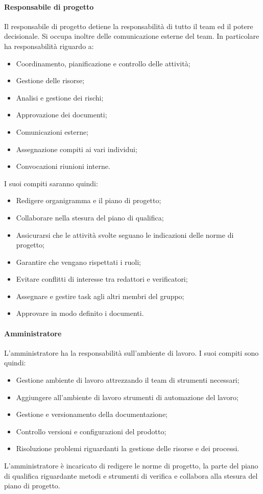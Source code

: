 \paragraph{Responsabile di progetto}
Il responsabile di progetto detiene la responsabilità di tutto il team ed il potere decisionale. Si occupa inoltre delle comunicazione esterne del team.
In particolare ha responsabilità riguardo a:
\begin{itemize}
	\item Coordinamento, pianificazione e controllo delle attività;
	\item Gestione delle risorse;
	\item Analisi e gestione dei rischi;
	\item Approvazione dei documenti;
	\item Comunicazioni esterne;
	\item Assegnazione compiti ai vari individui;
	\item Convocazioni riunioni interne.
\end{itemize}
I suoi compiti saranno quindi:
\begin{itemize}
	\item Redigere organigramma e il piano di progetto;
	\item Collaborare nella stesura del piano di qualifica;
	\item Assicurarsi che le attività svolte seguano le indicazioni delle norme di progetto;
	\item Garantire che vengano rispettati i ruoli;
	\item Evitare conflitti di interesse tra redattori e verificatori;
	\item Assegnare e gestire task agli altri membri del gruppo;
	\item Approvare in modo definito i documenti.
\end{itemize}
\paragraph{Amministratore}
L'amministratore ha la responsabilità sull'ambiente di lavoro.
I suoi compiti sono quindi:
\begin{itemize}
	\item Gestione ambiente di lavoro attrezzando il team di strumenti necessari;
	\item Aggiungere all'ambiente di lavoro strumenti di automazione del lavoro;
	\item Gestione e versionamento della documentazione;
	\item Controllo versioni e configurazioni del prodotto;
	\item Risoluzione problemi riguardanti la gestione delle risorse e dei processi.
\end{itemize}
L'amministratore è incaricato di redigere le norme di progetto, la parte del piano di qualifica riguardante metodi e strumenti di verifica e collabora alla stesura del piano di progetto.
